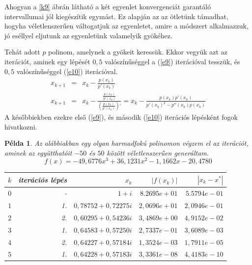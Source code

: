 \documentclass[a4paper,12pt]{report}
\newtheorem{Pl}[Tet]{Példa}
\begin{document}
			Ahogyan a \ref{k9} ábrán látható a két egyenlet konvergenciát garantáló intervallumai jól kiegészítik egymást. Ez alapján az az ötletünk támadhat, hogyha véletlenszerűen váltogatjuk az egyenletet, amire a módszert alkalmazzuk, jó eséllyel eljutunk az egyenletünk valamelyik gyökéhez.

			Tehát adott $p$ polinom, amelynek a gyökeit keressük. Ekkor vegyük azt az iterációt, aminek egy lépését $0,\!5$ valószínűséggel a (\ref{e9}) iterációval tesszük, és $0,\!5$ valószínűséggel (\ref{e10}) iterációval. 
			\begin{eqnarray}
				\label{e9}x_{k+1}&=&x_k- \frac{p(x_k)}{p'(x_k)}\\
				\label{e10}x_{k+1}&=&x_k-\frac{\frac{p(x_k)}{p'(x_k)}}{\left(\frac{p(x_k)}{p'(x_k)}\right)'}=x_k-\frac{p(x_k)p'(x_k)}{p'(x_k)^2-p''(x_k)p(x_k)}
			\end{eqnarray}
			A későbbiekben ezekre első (\ref{e9}), és második (\ref{e10}) iterációs lépésként fogok hivatkozni.
			\begin{Pl}
				Az alábbiakban egy olyan harmadfokú polinomon végzem el az iterációt, aminek az együtthatóit $-50$ és $50$ között véletlenszerűen generáltam.
				\[f(x)=-49,\!6776x^3+36,\!1231x^2-1,\!1662x-20,\!4780\]
				\begin{center}
					\begin{tabular}{|r|r|r|r|r|}
						\hline
						$k$ &   iterációs lépés &   $x_k$                   &   $|f(x_k)|$      &   $|x_k-x^*|$  \\ \hline
						$0$ &   -               &   $1+i$                   &   $8.2695e+01$    &   $5.5794e-01$ \\ 
						$1$ &   1.              &   $0,\!78752 + 0,\!72275i$    &   $2,\!0696e+01$    &   $2,\!0946e-01$ \\ 
						$2$ &   2.              &   $0,\!60295 + 0,\!54236i$    &   $3,\!4869e+00$    &   $4,\!9152e-02$ \\ 
						$3$ &   1.              &   $0,\!64583 + 0,\!57250i$    &   $2,\!7337e-01$    &   $3,\!6089e-03$ \\ 
						$4$ &   2.              &   $0,\!64227 + 0,\!57184i$    &   $1,\!3524e-03$    &   $1,\!7911e-05$ \\ 
						$5$ &   1.              &   $0,\!64228 + 0,\!57183i$    &   $3,\!3361e-08$    &   $4,\!4183e-10$ \\
						\hline
					\end{tabular}
				\end{center}
			\end{Pl}
\end{document}
